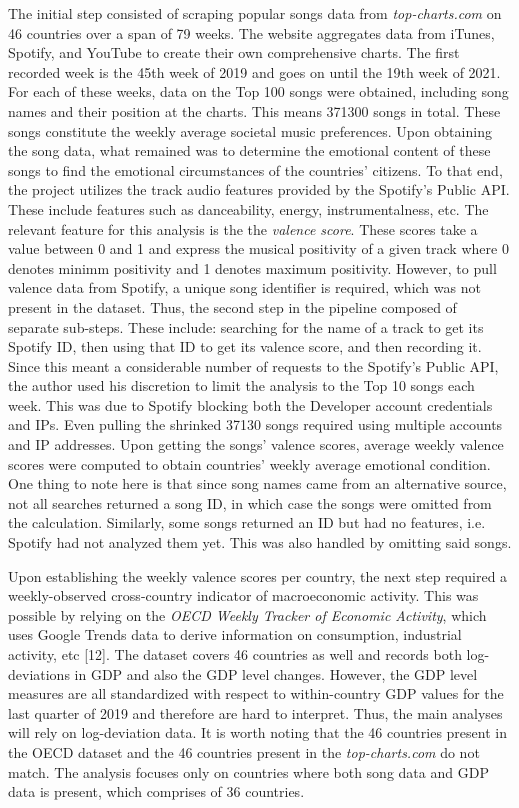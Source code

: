 \documentclass[12pt]{article}
\begin{document}
The initial step consisted of scraping popular songs data from \textit{top-charts.com} on 46 countries over a span of 79 weeks. The website aggregates data from iTunes, Spotify, and YouTube to create their own comprehensive charts. The first recorded week is the 45th week of 2019 and goes on until the 19th week of 2021. For each of these weeks, data on the Top 100 songs were obtained, including song names and their position at the charts. This means 371300 songs in total. These songs constitute the weekly average societal music preferences. Upon obtaining the song data, what remained was to determine the emotional content of these songs to find the emotional circumstances of the countries' citizens. To that end, the project utilizes the track audio features provided by the Spotify's Public API. These include features such as danceability, energy, instrumentalness, etc. The relevant feature for this analysis is the the \textit{valence score}. These scores take a value between 0 and 1 and express the musical positivity of a given track where 0 denotes minimm positivity and 1 denotes maximum positivity. However, to pull valence data from Spotify, a unique song identifier is required, which was not present in the dataset. Thus, the second step in the pipeline composed of separate sub-steps. These include: searching for the name of a track to get its Spotify ID, then using that ID to get its valence score, and then recording it. Since this meant a considerable number of requests to the Spotify's Public API, the author used his discretion to limit the analysis to the Top 10 songs each week. This was due to Spotify blocking both the Developer account credentials and IPs. Even pulling the shrinked 37130 songs required using multiple accounts and IP addresses. Upon getting the songs' valence scores, average weekly valence scores were computed to obtain countries' weekly average emotional condition. One thing to note here is that since song names came from an alternative source, not all searches returned a song ID, in which case the songs were omitted from the calculation. Similarly, some songs returned an ID but had no features, i.e. Spotify had not analyzed them yet. This was also handled by omitting said songs.

Upon establishing the weekly valence scores per country, the next step required a weekly-observed cross-country indicator of macroeconomic activity. This was possible by relying on the \textit{OECD Weekly Tracker of Economic Activity}, which uses Google Trends data to derive information on consumption, industrial activity, etc [12]. The dataset covers 46 countries as well and records both log-deviations in GDP and also the GDP level changes. However, the GDP level measures are all standardized with respect to within-country GDP values for the last quarter of 2019 and therefore are hard to interpret. Thus, the main analyses will rely on log-deviation data. It is worth noting that the 46 countries present in the OECD dataset and the 46 countries present in the \textit{top-charts.com} do not match. The analysis focuses only on countries where both song data and GDP data is present, which comprises of 36 countries. 
\end{document}
